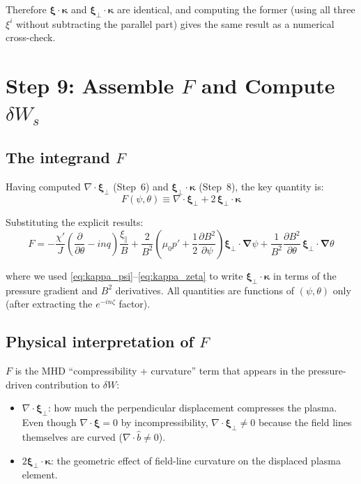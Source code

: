 \documentclass[12pt,a4paper]{article}
\newcommand{\bnabla}{\boldsymbol{\nabla}}
\newcommand{\bxi}{\boldsymbol{\xi}}
\begin{document}
Therefore $\bxi\cdot\bm{\kappa}$ and $\bxi_\perp\cdot\bm{\kappa}$ are identical, and computing the former (using all three $\xi^i$ without subtracting the parallel part) gives the same result as a numerical cross-check.

\section{Step 9: Assemble $F$ and Compute $\delta W_s$}

\subsection{The integrand $F$}

Having computed $\nabla\cdot\bxi_\perp$ (Step~6) and $\bxi_\perp\cdot\bm{\kappa}$ (Step~8), the key quantity is:
\begin{equation}
    \boxed{
    F(\psi,\theta) \equiv \nabla\cdot\bxi_\perp + 2\,\bxi_\perp\cdot\bm{\kappa}
    }
    \label{eq:F_def}
\end{equation}

Substituting the explicit results:
\begin{equation}
    F = -\frac{\chi'}{J}\!\left(\frac{\partial}{\partial\theta} - inq\right)\!\frac{\xi_\parallel}{B}
    + \frac{2}{B^2}\!\left(\mu_0 p' + \frac{1}{2}\frac{\partial B^2}{\partial\psi}\right)\bxi_\perp\cdot\bnabla\psi
    + \frac{1}{B^2}\frac{\partial B^2}{\partial\theta}\,\bxi_\perp\cdot\bnabla\theta
    \label{eq:F_explicit}
\end{equation}

where we used \eqref{eq:kappa_psi}--\eqref{eq:kappa_zeta} to write $\bxi_\perp\cdot\bm{\kappa}$ in terms of the pressure gradient and $B^2$ derivatives. All quantities are functions of $(\psi,\theta)$ only (after extracting the $e^{-in\zeta}$ factor).

\subsection{Physical interpretation of $F$}

$F$ is the MHD ``compressibility + curvature'' term that appears in the pressure-driven contribution to $\delta W$:
\begin{itemize}
    \item $\nabla\cdot\bxi_\perp$: how much the perpendicular displacement compresses the plasma. Even though $\nabla\cdot\boldsymbol{\xi} = 0$ by incompressibility, $\nabla\cdot\bxi_\perp \neq 0$ because the field lines themselves are curved ($\nabla\cdot\hat{b} \neq 0$).
    \item $2\bxi_\perp\cdot\bm{\kappa}$: the geometric effect of field-line curvature on the displaced plasma element.
\end{itemize}
\end{document}
